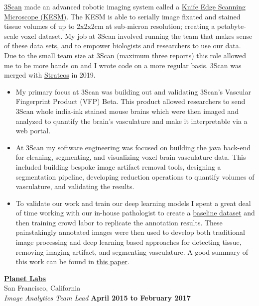 \documentclass[10pt]{article}
\newenvironment{outerlist}[1][\enskip\textbullet]%
        {\begin{itemize}[#1]}{\end{itemize}%
         \vspace{-.6\baselineskip}}
\newcommand{\blankline}{\quad\pagebreak[2]}
\begin{document}
\href{http://www.3can.com}{3Scan} made an advanced robotic imaging system called a \href{https://youtu.be/GBj9hTrN0Yk}{Knife Edge Scanning Microscope (KESM)}. The KESM is able to serially image fixated and stained tissue volumes of up to 2x2x2cm at sub-micron resolution; creating a petabyte-scale voxel dataset. My job at 3Scan involved running the team that makes sense of these data sets, and to empower biologists and researchers to use our data. Due to the small team size at 3Scan (maximum three reports) this role allowed me to be more hands on and I wrote code on a more regular basis. 3Scan was merged with \href{https://strateos.com/}{Strateos} in 2019.  
\begin{outerlist}
\item My primary focus at 3Scan was building out and validating 3Scan's Vascular Fingerprint Product (VFP) Beta. This product allowed researchers to send 3Scan whole india-ink stained mouse brains which were then imaged and analyzed to quantify the brain's vasculature and make it interpretable via a web portal. 
\item At 3Scan my software engineering was focused on building the java back-end for cleaning, segmenting, and visualizing voxel brain vasculature data. This included building bespoke image artifact removal tools, designing a segmentation pipeline, developing reduction operations to quantify volumes of vasculature, and validating the results. 
\item To validate our work and train our deep learning models I spent a great deal of time working with our in-house pathologist to create a \href{http://www.3scan.com/open-data/}{baseline dataset} and then training crowd labor to replicate the annotation results. These painstakingly annotated images were then used to develop both traditional image processing and deep learning based approaches for detecting tissue, removing imaging artifact, and segmenting vasculature. A good summary of this work can be found in \href{https://github.com/osbd/osbd-2018/raw/master/proceedings/S09204_4274.pdf}{this paper}. 
\end{outerlist}
\blankline
\newline

\href{http://www.planet.com/}{\textbf{Planet Labs}} \\
San Francisco, California \\
\textit{Image Analytics Team Lead}%
        \hfill \textbf{April 2015 to February 2017}  \\
\end{document}
